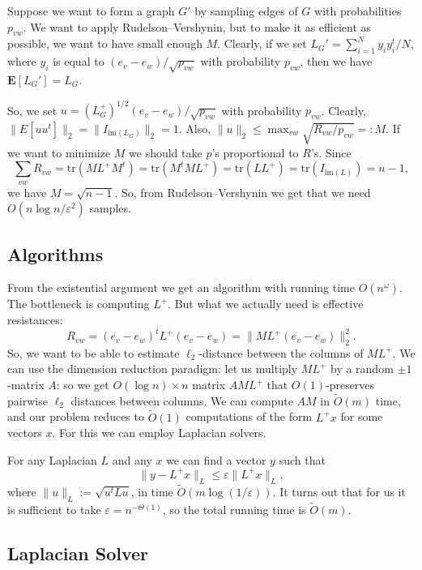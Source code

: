 \documentclass[12pt]{article}
\newcommand{\eps}{\varepsilon}
\begin{document}
    Suppose we want to form a graph $G'$ by sampling edges of $G$ with probabilities
    $p_{vw}$.
    We want to apply Rudelson--Vershynin, but to make it as efficient as possible, we want
    to have small enough $M$.
    Clearly, if we set $L_G' = \sum_{i=1}^N y_i y_i^t / N$, where $y_i$ is equal to
    $(e_v - e_w) / \sqrt{p_{vw}}$ with probability $p_{vw}$, then we have
    $\mathbf{E}[L_G'] = L_G$.

    So, we set $u = (L_G^+)^{1/2} (e_v - e_w) / \sqrt{p_{vw}}$ with probability $p_{vw}$.
    Clearly, $\|E[uu^t]\|_2 = \|I_{\mathrm{im}(L_G)}\|_2 = 1$. Also,
    $\|u\|_2 \leq \max_{vw} \sqrt{R_{vw} / p_{vw}} =: M$.
    If we want to minimize $M$ we should take $p$'s proportional to $R$'s.
    Since
    $$
        \sum_{vw} R_{vw} = \mathrm{tr}(ML^+M^t) = \mathrm{tr}(M^tML^+) =
        \mathrm{tr}(LL^+) = \mathrm{tr}(I_{\mathrm{im}(L)}) = n - 1,
    $$
    we have $M = \sqrt{n - 1}$. So, from Rudelson--Vershynin we get that we need
    $O(n \log n / \eps^2)$ samples.

    \subsection{Algorithms}

    From the existential argument we get an algorithm with running time $O(n^{\omega})$.
    The bottleneck is computing $L^+$.
    But what we actually need is effective resistances:
    $$
        R_{vw} = (e_v - e_w)^t L^+ (e_v - e_w) = \|ML^+ (e_v - e_w)\|_2^2.
    $$
    So, we want to be able to estimate $\ell_2$-distance between the columns of
    $ML^+$. We can use the dimension reduction paradigm: let us multiply $ML^+$ by
    a random $\pm 1$-matrix $A$: so we get $O(\log n) \times n$ matrix $AML^+$ that
    $O(1)$-preserves pairwise $\ell_2$ distances between columns.
    We can compute $AM$ in $\tilde{O}(m)$ time, and our problem reduces to $\tilde{O}(1)$
    computations of the form $L^+ x$ for some vectors $x$. For this we can employ
    Laplacian solvers.

    For any Laplacian $L$ and any $x$ we can find a vector $y$ such that
    $$
        \|y - L^+x\|_L \leq \eps \|L^+x\|_L,
    $$
    where $\|u\|_L := \sqrt{u^t L u}$, in time $\tilde{O}(m \log(1 / \eps))$. It turns out
    that for us it is sufficient to take $\eps = n^{-\Theta(1)}$, so the total running time
    is $\tilde{O}(m)$.

    \subsection{Laplacian Solver}
\end{document}
